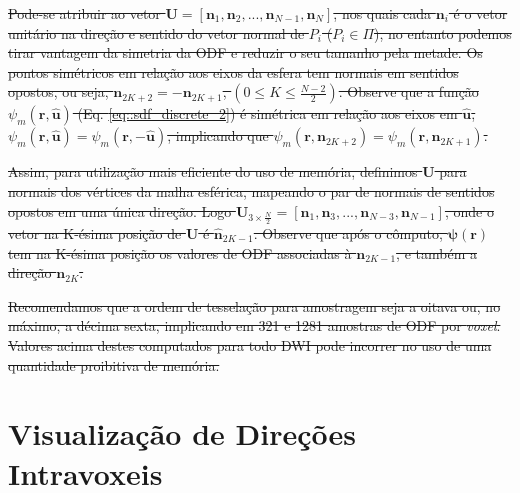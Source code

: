 \documentclass[
    12pt,                %
    oneside,            %
    a4paper,            %
    english,            %
    french,                %
    spanish,            %
    brazil                %
    ]{abntex2}
\begin{document}
\sout{
Pode-se atribuir ao vetor $\mathbf{U} = [
\mathbf{n}_1, 
\mathbf{n}_2, ...,
\mathbf{n}_{N-1},
\mathbf{n}_N
]$, nos quais cada $\mathbf{n}_i$ é o vetor unitário na direção e sentido do vetor normal de $P_i$ ($P_i \in \Pi$), no entanto podemos tirar vantagem da simetria da ODF e reduzir o seu tamanho pela metade. Os pontos simétricos em relação aos eixos da esfera tem normais em sentidos opostos, ou seja, $\mathbf{n}_{2K+2} = -\mathbf{n}_{2K+1}$, $(0 \leq K \leq \frac{N-2}{2})$. Observe que a função $\psi_m(\mathbf{r}, \mathbf{\hat{u}})$ (Eq. \ref{eq::sdf_discrete_2}) é simétrica em relação aos eixos em $\mathbf{\hat{u}}$, $\psi_m(\mathbf{r}, \mathbf{\hat{u}}) = \psi_m(\mathbf{r}, \mathbf{-\hat{u}})$, implicando que $\psi_m(\mathbf{r}, \mathbf{n}_{2K+2}) = \psi_m(\mathbf{r}, \mathbf{n}_{2K+1})$.
}

\sout{
Assim, para utilização mais eficiente do uso de memória, definimos $\mathbf{U}$ para normais dos vértices da malha esférica, mapeando o par de normais de sentidos opostos em uma única direção. Logo $\mathbf{U}_{3\times \frac{N}{2}} = [
\mathbf{n}_1,
\mathbf{n}_3, ..., 
\mathbf{n}_{N-3},
\mathbf{n}_{N-1}
]$, onde o vetor na K-ésima  posição de $\mathbf{U}$ é $\mathbf{\hat{n}}_{2K-1}$. Observe que após o cômputo, $\boldsymbol{\psi}(\mathbf{r})$ tem na K-ésima posição os valores de ODF associadas à $\mathbf{n}_{2K-1}$, e também a direção $\mathbf{n}_{2K}$.
}

\sout{
Recomendamos que a ordem de tesselação para amostragem seja a oitava ou, no máximo, a décima sexta, implicando em 321 e 1281 amostras de ODF por \textit{voxel}. Valores acima destes computados para todo DWI pode incorrer no uso de uma quantidade proibitiva de memória.
}




\section{Visualização de Direções Intravoxeis}
\label{sec::vis_dODFs}


\end{document}

